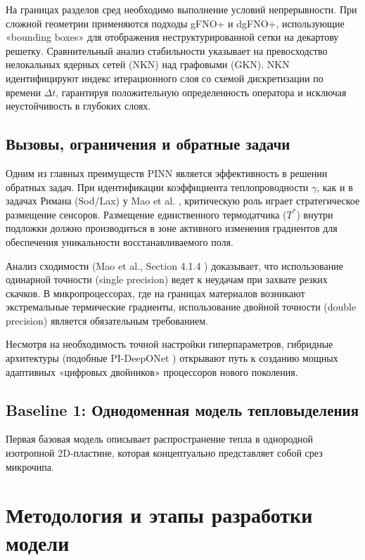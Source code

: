 \documentclass[conference]{IEEEtran}
\begin{document}
    На границах разделов сред необходимо выполнение условий непрерывности. При сложной геометрии применяются подходы gFNO+ и dgFNO+, использующие «bounding boxes» для отображения неструктурированной сетки на декартову решетку. Сравнительный анализ стабильности указывает на превосходство нелокальных ядерных сетей (NKN) над графовыми (GKN). NKN идентифицируют индекс итерационного слоя со схемой дискретизации по времени $\Delta t$, гарантируя положительную определенность оператора и исключая неустойчивость в глубоких слоях.
    
    \subsection{Вызовы, ограничения и обратные задачи}
    Одним из главных преимуществ PINN является эффективность в решении обратных задач. При идентификации коэффициента теплопроводности $\gamma$, как и в задачах Римана (Sod/Lax) у Mao et al. \cite{mao2020}, критическую роль играет стратегическое размещение сенсоров. Размещение единственного термодатчика ($T^*$) внутри подложки должно производиться в зоне активного изменения градиентов для обеспечения уникальности восстанавливаемого поля.
    
    Анализ сходимости (Mao et al., Section 4.1.4 \cite{mao2020}) доказывает, что использование одинарной точности (single precision) ведет к неудачам при захвате резких скачков. В микропроцессорах, где на границах материалов возникают экстремальные термические градиенты, использование двойной точности (double precision) является обязательным требованием.
    
    Несмотря на необходимость точной настройки гиперпараметров, гибридные архитектуры (подобные PI-DeepONet \cite{goswami2022}) открывают путь к созданию мощных адаптивных «цифровых двойников» процессоров нового поколения.
    

\subsection{Baseline 1: Однодоменная модель тепловыделения}

Первая базовая модель описывает распространение тепла в однородной изотропной 2D-пластине, которая концептуально представляет собой срез микрочипа. 

\section{Методология и этапы разработки модели}
\end{document}
